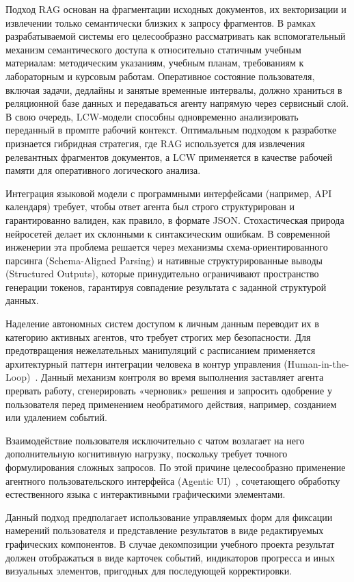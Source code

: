 Подход RAG основан на фрагментации исходных документов, их векторизации и извлечении только семантически близких к запросу фрагментов. В рамках разрабатываемой системы его целесообразно рассматривать как вспомогательный механизм семантического доступа к относительно статичным учебным материалам: методическим указаниям, учебным планам, требованиям к лабораторным и курсовым работам. Оперативное состояние пользователя, включая задачи, дедлайны и занятые временные интервалы, должно храниться в реляционной базе данных и передаваться агенту напрямую через сервисный слой. В свою очередь, LCW-модели способны одновременно анализировать переданный в промпте рабочий контекст. Оптимальным подходом к разработке признается гибридная стратегия, где RAG используется для извлечения релевантных фрагментов документов, а LCW применяется в качестве рабочей памяти для оперативного логического анализа.

\numberedparagraph
Интеграция языковой модели с программными интерфейсами (например, API календаря) требует, чтобы ответ агента был строго структурирован и гарантированно валиден, как правило, в формате JSON. Стохастическая природа нейросетей делает их склонными к синтаксическим ошибкам. В современной инженерии эта проблема решается через механизмы схема-ориентированного парсинга (Schema-Aligned Parsing) и нативные структурированные выводы (Structured Outputs)\cite{Rein2024}, которые принудительно ограничивают пространство генерации токенов, гарантируя совпадение результата с заданной структурой данных.

Наделение автономных систем доступом к личным данным переводит их в категорию активных агентов, что требует строгих мер безопасности. Для предотвращения нежелательных манипуляций с расписанием применяется архитектурный паттерн интеграции человека в контур управления (Human-in-the-Loop)~\cite{Holzinger2016}. Данный механизм контроля во время выполнения заставляет агента прервать работу, сгенерировать «черновик» решения и запросить одобрение у пользователя перед применением необратимого действия, например, созданием или удалением событий.

\numberedparagraph
Взаимодействие пользователя исключительно с чатом возлагает на него дополнительную когнитивную нагрузку, поскольку требует точного формулирования сложных запросов. По этой причине целесообразно применение агентного пользовательского интерфейса (Agentic UI)~\cite{Zhao2024}, сочетающего обработку естественного языка с интерактивными графическими элементами.

Данный подход предполагает использование управляемых форм для фиксации намерений пользователя и представление результатов в виде редактируемых графических компонентов. В случае декомпозиции учебного проекта результат должен отображаться в виде карточек событий, индикаторов прогресса и иных визуальных элементов, пригодных для последующей корректировки.
